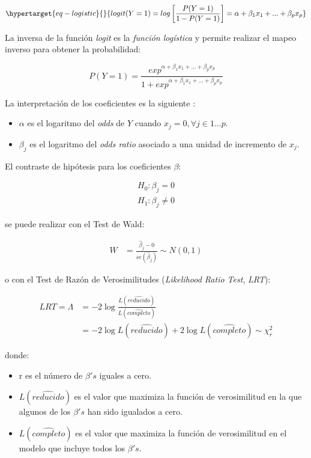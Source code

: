 \documentclass[
  12pt,
  a4paper,
  extrafontsizes,
  onecolumn,
  openright,
  table]{memoir}
\providecommand{\tightlist}{%
  \setlength{\itemsep}{0pt}\setlength{\parskip}{0pt}}\usepackage{longtable,booktabs,array}
\begin{document}
\begin{equation}\protect\hypertarget{eq-logistic}{}{
logit(Y=1) = log \left[\frac{P(Y=1)}{1-P(Y=1)} \right] = \alpha+\beta_1x_1+...+\beta_px_p
}\label{eq-logistic}\end{equation}

La inversa de la función \emph{logit} es la
\emph{\gls{función logística}} y permite realizar el mapeo inverso para
obtener la probabilidad:

\[
P(Y=1) = \frac{exp^{\alpha+\beta_1x_1+...+\beta_px_p}}{1 + exp^{\alpha+\beta_1x_1+...+\beta_px_p}}
\]

La interpretación de los coeficientes es la siguiente
\autocite[ver][p.~260]{frienly2015}:

\begin{itemize}
\tightlist
\item
  \(\alpha\) es el logaritmo del \emph{\gls{odds}} de \(Y\) cuando
  \(x_j=0, \forall j \in 1...p\).
\item
  \(\beta_j\) es el logaritmo del \emph{\gls{odds ratio}} asociado a una
  unidad de incremento de \(x_j\).
\end{itemize}

El contraste de hipótesis para los coeficientes \(\beta\):

\[
\begin{aligned}
H_0: \beta_j =  0 \\
H_1: \beta_j \ne  0
\end{aligned}
\]

se puede realizar con el Test de Wald:

\[
\begin{aligned}
W & = \frac{\hat\beta_j - 0}{se(\hat\beta_j)} \sim N(0,1)
\end{aligned}
\]

o con el Test de Razón de Verosimilitudes (\emph{Likelihood Ratio Test},
\emph{\gls{LRT}}):

\[
\begin{aligned}
LRT = \Lambda &= -2 \log \frac{L(\widehat{reducido})}{L(\widehat{completo})}\\
&= -2 \log L(\widehat{reducido}) + 2 \log L(\widehat{completo}) \sim \chi^2_r
\end{aligned}
\]

donde:

\begin{itemize}
\tightlist
\item
  r es el número de \(\beta's\) iguales a cero.
\item
  \(L(\widehat{reducido})\) es el valor que maximiza la función de
  verosimilitud en la que algunos de los \(\beta's\) han sido igualados
  a cero.
\item
  \(L(\widehat{completo})\) es el valor que maximiza la función de
  verosimilitud en el modelo que incluye todos los \(\beta's\).
\end{itemize}
\end{document}
